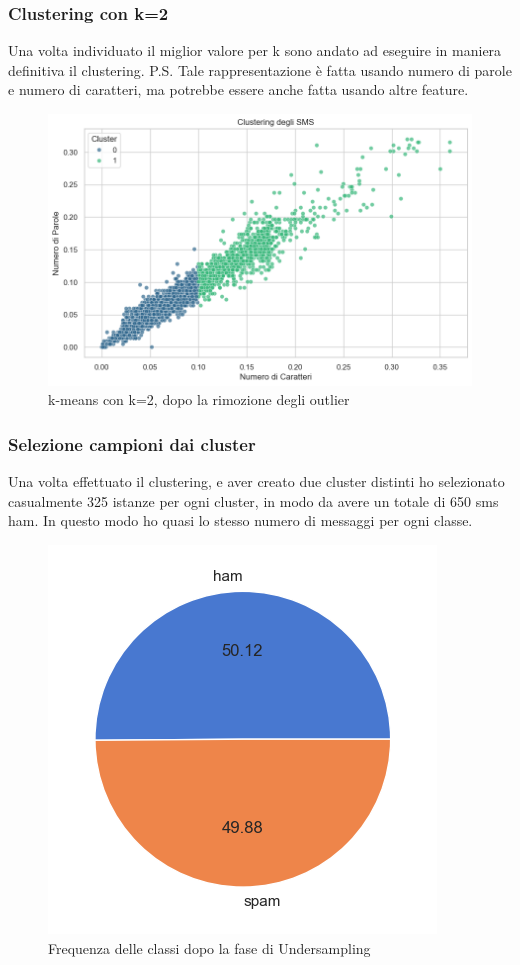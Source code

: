 \documentclass[]{article}
\begin{document}
            \subsubsection{Clustering con k=2}
                Una volta individuato il miglior valore per k sono andato ad eseguire in maniera definitiva il clustering. P.S. Tale rappresentazione è fatta usando numero di parole e numero di caratteri, ma potrebbe essere anche fatta usando altre feature.
                \begin{figure}[H]
                    \centering
                    \includegraphics[width=0.9\linewidth]{images/clust.png}
                    \caption{k-means con k=2, dopo la rimozione degli outlier}
                    \label{fig:enter-label}
                \end{figure}

            \subsubsection{Selezione campioni dai cluster}
                Una volta effettuato il clustering, e aver creato due cluster distinti ho selezionato casualmente 325 istanze per ogni cluster, in modo da avere un totale di 650 sms ham. In questo modo ho quasi lo stesso numero di messaggi per ogni classe.

                \begin{figure}[H]
                    \centering
                    \includegraphics[width=0.5\linewidth]{images/datasetBilanciato.png}
                    \caption{Frequenza delle classi dopo la fase di Undersampling}
                    \label{fig:enter-label}
                \end{figure}
\end{document}
